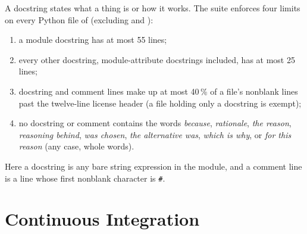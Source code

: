 A docstring states what a thing is or how it works. The suite  enforces four limits on every Python file of  (excluding  and ):
\begin{enumerate}
\item a module docstring has at most 55 lines;
\item every other docstring, module-attribute docstrings included, has at most 25 lines;
\item docstring and comment lines make up at most 40\,\% of a file's nonblank lines past the twelve-line license header (a file holding only a docstring is exempt);
\item no docstring or comment contains the words \emph{because}, \emph{rationale}, \emph{the reason}, \emph{reasoning behind}, \emph{was chosen}, \emph{the alternative was}, \emph{which is why}, or \emph{for this reason} (any case, whole words).
\end{enumerate}
Here a docstring is any bare string expression in the module, and a comment line is a line whose first nonblank character is \texttt{\#}.

\section{Continuous Integration}\label{sec:dev-ci}


